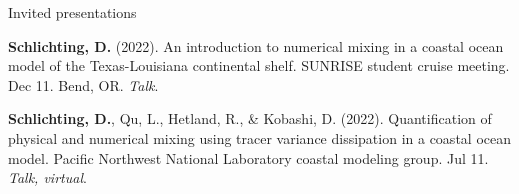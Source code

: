 \documentclass{resume} %
\begin{document}
\begin{rSection}{Invited presentations}
\vspace{-3pt}

\begin{etaremune}
    \item \textbf{Schlichting, D.} (2022). An introduction to numerical mixing in a coastal ocean model of the Texas-Louisiana continental shelf. SUNRISE student cruise meeting. Dec 11. Bend, OR. \textit{Talk}.
    \item \textbf{Schlichting, D.}, Qu, L., Hetland, R., \& Kobashi, D. (2022). Quantification of physical and numerical mixing using tracer variance dissipation in a coastal ocean model. Pacific Northwest National Laboratory coastal modeling group. Jul 11. \textit{Talk, virtual}.
\end{etaremune}
\end{rSection}
\end{document}
